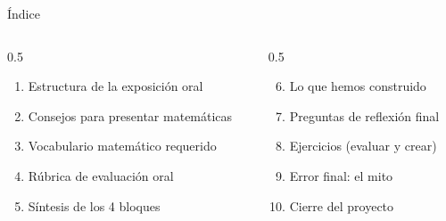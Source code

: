 \documentclass[aspectratio=169, 10pt, spanish]{beamer}
\begin{document}
\begin{frame}[plain]\titlepage\end{frame}

\begin{frame}{Índice}
  \begin{columns}[t]
    \begin{column}{0.5\textwidth}
      \begin{enumerate}
        \item Estructura de la exposición oral
        \item Consejos para presentar matemáticas
        \item Vocabulario matemático requerido
        \item Rúbrica de evaluación oral
        \item Síntesis de los 4 bloques
      \end{enumerate}
    \end{column}
    \begin{column}{0.5\textwidth}
      \begin{enumerate}\setcounter{enumi}{5}
        \item Lo que hemos construido
        \item Preguntas de reflexión final
        \item Ejercicios (evaluar y crear)
        \item Error final: el mito
        \item Cierre del proyecto
      \end{enumerate}
    \end{column}
  \end{columns}
\end{frame}

\end{document}
